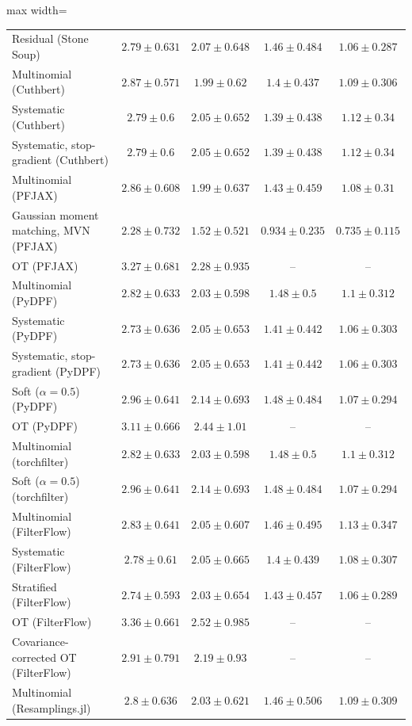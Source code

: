 \begin{table}[H]
\begin{adjustbox}{max width=\linewidth}
\begin{tabular}{lcccc}
Residual (Stone Soup) & $2.79\pm0.631$ & $2.07\pm0.648$ & $1.46\pm0.484$ & $1.06\pm0.287$ \\
Multinomial (Cuthbert) & $2.87\pm0.571$ & $1.99\pm0.62$ & $1.4\pm0.437$ & $1.09\pm0.306$ \\
Systematic (Cuthbert) & $2.79\pm0.6$ & $2.05\pm0.652$ & $1.39\pm0.438$ & $1.12\pm0.34$ \\
Systematic, stop-gradient (Cuthbert) & $2.79\pm0.6$ & $2.05\pm0.652$ & $1.39\pm0.438$ & $1.12\pm0.34$ \\
Multinomial (PFJAX) & $2.86\pm0.608$ & $1.99\pm0.637$ & $1.43\pm0.459$ & $1.08\pm0.31$ \\
Gaussian moment matching, MVN (PFJAX) & $\mathbf{2.28\pm0.732}$ & $\mathbf{1.52\pm0.521}$ & $\mathbf{0.934\pm0.235}$ & $\mathbf{0.735\pm0.115}$ \\
OT (PFJAX) & $3.27\pm0.681$ & $2.28\pm0.935$ & -- & -- \\
Multinomial (PyDPF) & $2.82\pm0.633$ & $2.03\pm0.598$ & $1.48\pm0.5$ & $1.1\pm0.312$ \\
Systematic (PyDPF) & $2.73\pm0.636$ & $2.05\pm0.653$ & $1.41\pm0.442$ & $1.06\pm0.303$ \\
Systematic, stop-gradient (PyDPF) & $2.73\pm0.636$ & $2.05\pm0.653$ & $1.41\pm0.442$ & $1.06\pm0.303$ \\
Soft ($\alpha{=}0.5$) (PyDPF) & $2.96\pm0.641$ & $2.14\pm0.693$ & $1.48\pm0.484$ & $1.07\pm0.294$ \\
OT (PyDPF) & $3.11\pm0.666$ & $2.44\pm1.01$ & -- & -- \\
Multinomial (torchfilter) & $2.82\pm0.633$ & $2.03\pm0.598$ & $1.48\pm0.5$ & $1.1\pm0.312$ \\
Soft ($\alpha{=}0.5$) (torchfilter) & $2.96\pm0.641$ & $2.14\pm0.693$ & $1.48\pm0.484$ & $1.07\pm0.294$ \\
Multinomial (FilterFlow) & $2.83\pm0.641$ & $2.05\pm0.607$ & $1.46\pm0.495$ & $1.13\pm0.347$ \\
Systematic (FilterFlow) & $2.78\pm0.61$ & $2.05\pm0.665$ & $1.4\pm0.439$ & $1.08\pm0.307$ \\
Stratified (FilterFlow) & $2.74\pm0.593$ & $2.03\pm0.654$ & $1.43\pm0.457$ & $1.06\pm0.289$ \\
OT (FilterFlow) & $3.36\pm0.661$ & $2.52\pm0.985$ & -- & -- \\
Covariance-corrected OT (FilterFlow) & $2.91\pm0.791$ & $2.19\pm0.93$ & -- & -- \\
Multinomial (Resamplings.jl) & $2.8\pm0.636$ & $2.03\pm0.621$ & $1.46\pm0.506$ & $1.09\pm0.309$ \\

\end{tabular}
\end{adjustbox}
\end{table}

